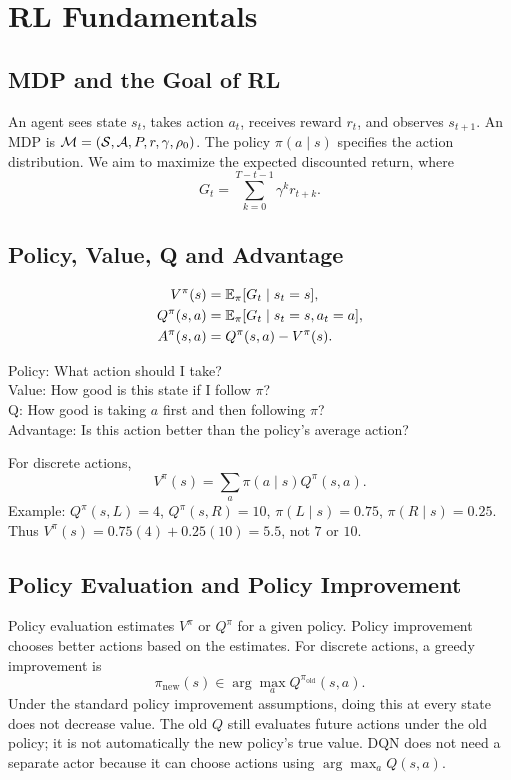 \chapter{RL Fundamentals}
\section{MDP and the Goal of RL}
An agent sees state $s_t$, takes action $a_t$, receives reward $r_t$, and observes $s_{t+1}$. An MDP is $\mathcal{M}=(\mathcal{S},\mathcal{A},P,r,\gamma,\rho_0)$. The policy $\pi(a\mid s)$ specifies the action distribution. We aim to maximize the expected discounted return, where
\begin{equation}G_t=\sum_{k=0}^{T-t-1}\gamma^k r_{t+k}.\end{equation}
\section{Policy, Value, Q and Advantage}
\begin{align}
V^\pi(s)&=\mathbb{E}_\pi[G_t\mid s_t=s],\\
Q^\pi(s,a)&=\mathbb{E}_\pi[G_t\mid s_t=s,a_t=a],\\
A^\pi(s,a)&=Q^\pi(s,a)-V^\pi(s).
\end{align}
\begin{intuition}
Policy: What action should I take?\\
Value: How good is this state if I follow $\pi$?\\
Q: How good is taking $a$ first and then following $\pi$?\\
Advantage: Is this action better than the policy's average action?
\end{intuition}
For discrete actions,
\begin{equation}V^\pi(s)=\sum_a\pi(a\mid s)Q^\pi(s,a).\end{equation}
Example: $Q^\pi(s,L)=4$, $Q^\pi(s,R)=10$, $\pi(L\mid s)=0.75$, $\pi(R\mid s)=0.25$. Thus $V^\pi(s)=0.75(4)+0.25(10)=5.5$, not $7$ or $10$.
\section{Policy Evaluation and Policy Improvement}
Policy evaluation estimates $V^\pi$ or $Q^\pi$ for a given policy. Policy improvement chooses better actions based on the estimates. For discrete actions, a greedy improvement is
\begin{equation}\pi_{\mathrm{new}}(s)\in\arg\max_a Q^{\pi_{\mathrm{old}}}(s,a).\end{equation}
Under the standard policy improvement assumptions, doing this at every state does not decrease value. The old $Q$ still evaluates future actions under the old policy; it is not automatically the new policy's true value. DQN does not need a separate actor because it can choose actions using $\arg\max_a Q(s,a)$.
